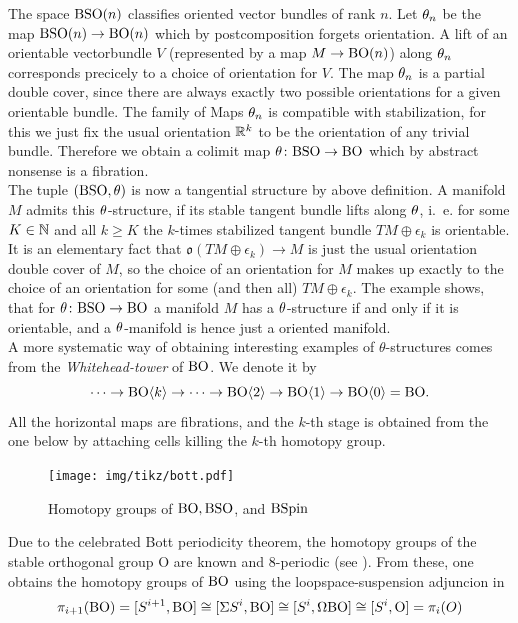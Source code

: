 The space $\mathrm{BSO}(n)$ classifies oriented vector bundles of rank $n$. Let $\theta_n$ be the map $\mathrm{BSO}(n) \to \mathrm{BO}(n)$ which by postcomposition forgets orientation.
A lift of an orientable vectorbundle $V$ (represented by a map $M\to \mathrm{BO}(n)$) along $\theta_n$ corresponds precicely to a choice of orientation for $V$. 
The map $\theta_n$ is a partial double cover, since there are always exactly two possible orientations for a given orientable bundle.
The family of Maps $\theta_n$ is compatible with stabilization, for this we just fix the usual orientation $\mathbb{R}^k$ to be the orientation of any trivial bundle. 
Therefore we obtain a colimit map $\theta\colon \mathrm{BSO} \to \mathrm{BO}$ which by abstract nonsense is a fibration.\\
The tuple $(\mathrm{BSO},\theta)$ is now a tangential structure by above definition. 
A manifold $M$ admits this $\theta$-structure, if its stable tangent bundle lifts along $\theta$, i.~e. for some $K\in\mathbb{N}$ and all $k\geq K$ the $k$-times stabilized tangent bundle $TM\oplus \epsilon_k$ is orientable.
It is an elementary fact that $\mathfrak{o}(TM\oplus \epsilon_k) \to M$ is just the usual orientation double cover of $M$, so the choice of an orientation for $M$ makes up exactly to the choice of an orientation for some (and then all) $TM\oplus\epsilon_k$.
The example shows, that for $\theta\colon \mathrm{BSO} \to \mathrm{BO}$ a manifold $M$ has a $\theta$-structure if and only if it is orientable, and a $\theta$-manifold is hence just a oriented manifold. \\
A more systematic way of obtaining interesting examples of $\theta$-structures comes from the \emph{Whitehead-tower} of $\mathrm{BO}$.
We denote it by 
\begin{equation*}
    \cdots \to \mathrm{BO}\langle k\rangle \to \cdots \to \mathrm{BO}\langle 2\rangle \to \mathrm{BO}\langle 1\rangle \to \mathrm{BO}\langle 0\rangle = \mathrm{BO}.
\end{equation*}
All the horizontal maps are fibrations, and the $k$-th stage is obtained from the one below by attaching cells killing the $k$-th homotopy group.
\begin{figure}
    \centering
    \texttt{[image: img/tikz/bott.pdf]}
    \caption{Homotopy groups of $\mathrm{BO},\mathrm{BSO}$, and $\mathrm{BSpin}$}\label{fig:bott}
\end{figure}
Due to the celebrated Bott periodicity theorem, the homotopy groups of the stable orthogonal group $\mathrm{O}$ are known and $8$-periodic (see ).
From these, one obtains the homotopy groups of $\mathrm{BO}$ using the loopspace-suspension adjuncion in
\begin{equation*}
    \pi_{i+1}(\mathrm{BO}) = [S^{i+1},\mathrm{BO}] \cong [\Sigma S^i,\mathrm{BO}] \cong [S^i,\Omega\mathrm{BO}] \cong [S^i,\mathrm{O}] = \pi_i(O)
\end{equation*}
